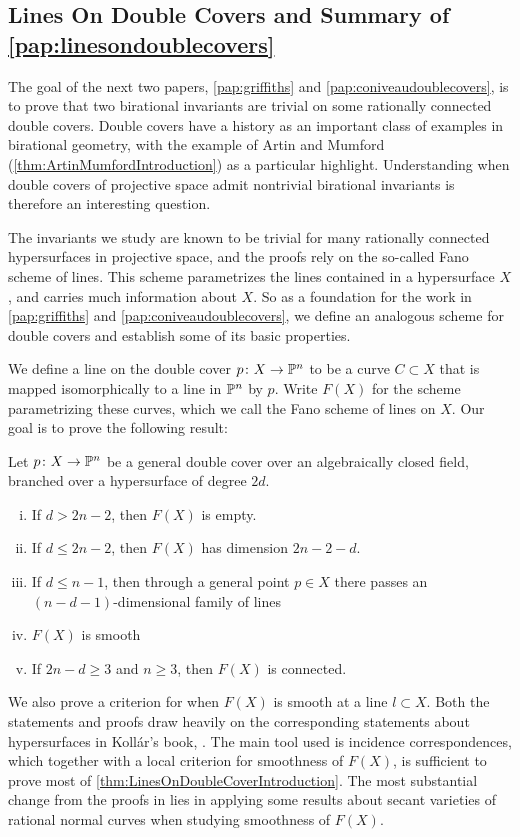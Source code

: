 \subsection{Lines On Double Covers and Summary of \cref{pap:linesondoublecovers}}
The goal of the next two papers, \cref{pap:griffiths} and \cref{pap:coniveaudoublecovers}, is to prove that two birational invariants are trivial on some rationally connected double covers. Double covers have a history as an important class of examples in birational geometry, with the example of Artin and Mumford (\cref{thm:ArtinMumfordIntroduction}) as a particular highlight. Understanding when double covers of projective space admit nontrivial birational invariants is therefore an interesting question.

The invariants we study are known to be trivial for many rationally connected  hypersurfaces in projective space, and the proofs rely on the so-called Fano scheme of lines. This scheme parametrizes the lines contained in a hypersurface $X$, and carries much information about $X$. So as a foundation for the work in \cref{pap:griffiths} and \cref{pap:coniveaudoublecovers}, we define an analogous scheme for double covers and establish some of its basic properties.

We define a line on the double cover $p \from X \to \P^n$ to be a curve $C \subset X$ that is mapped isomorphically to a line in $\P^n$ by $p$. Write $F(X)$ for the scheme parametrizing these curves, which we call the Fano scheme of lines on $X$. Our goal is to prove the following result:
\begin{theorem}
	\label{thm:LinesOnDoubleCoverIntroduction}
	Let $p \from X \to \P^n$ be a general double cover over an algebraically closed field, branched over a hypersurface of degree $2d$.
	\begin{enumerate}[i)]
		\item If $d > 2n - 2$, then $F(X)$ is empty.
		\item If $d \leq 2n - 2$, then $F(X)$ has dimension $2n-2-d$.
		\item If $d \leq n-1$, then through a general point $p \in X$ there passes an $(n-d-1)$-dimensional family of lines
		\item $F(X)$ is smooth
		\item If $2n-d \geq 3$ and $n \geq 3$, then $F(X)$ is connected.
	\end{enumerate}
\end{theorem}
We also prove a criterion for when $F(X)$ is smooth at a line $l \subset X$. Both the statements and proofs draw heavily on the corresponding statements about hypersurfaces in Koll\'ar's book, \cite[Section V.4]{KollarRationalCurves}. The main tool used is incidence correspondences, which together with a local criterion for smoothness of $F(X)$, is sufficient to prove most of \cref{thm:LinesOnDoubleCoverIntroduction}. The most substantial change from the proofs in \cite[Section V.4]{KollarRationalCurves} lies in applying some results about secant varieties of rational normal curves when studying smoothness of $F(X)$.



